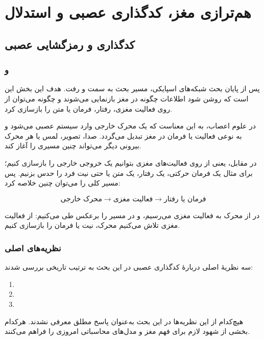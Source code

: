 \chapter{هم‌ترازی مغز، کدگذاری عصبی و استدلال}

\section{کدگذاری و رمزگشایی عصبی}

\subsection{ و }
پس از پایان بحث شبکه‌های اسپایکی، مسیر بحث به سمت  و  رفت. هدف این بخش این است که روشن شود اطلاعات چگونه در مغز بازنمایی می‌شوند و چگونه می‌توان از روی فعالیت مغزی، رفتار، فرمان یا متن را بازسازی کرد.

در علوم اعصاب،  به این معناست که یک محرک خارجی وارد سیستم عصبی می‌شود و به نوعی فعالیت یا فرمان در مغز تبدیل می‌گردد. صدا، تصویر، لمس یا هر محرک بیرونی دیگر می‌تواند چنین مسیری را آغاز کند.

در مقابل،  یعنی از روی فعالیت‌های مغزی بتوانیم یک خروجی خارجی را بازسازی کنیم؛ برای مثال یک فرمان حرکتی، یک رفتار، یک متن یا حتی نیت فرد را حدس بزنیم. پس مسیر کلی را می‌توان چنین خلاصه کرد:

\[
\text{محرک خارجی} \longrightarrow \text{فعالیت مغزی} \longrightarrow \text{فرمان یا رفتار}
\]

در  از محرک به فعالیت مغزی می‌رسیم، و در  مسیر را برعکس طی می‌کنیم: از فعالیت مغزی تلاش می‌کنیم محرک، نیت یا فرمان را بازسازی کنیم.

\subsection{نظریه‌های اصلی }
سه نظریهٔ اصلی دربارهٔ کدگذاری عصبی در این بحث به ترتیب تاریخی بررسی شدند:

\begin{enumerate}
  \item {}
  \item {}
  \item {}
\end{enumerate}

هیچ‌کدام از این نظریه‌ها در این بحث به‌عنوان پاسخ مطلق معرفی نشدند. هرکدام بخشی از شهود لازم برای فهم مغز و مدل‌های محاسباتی امروزی را فراهم می‌کنند.

